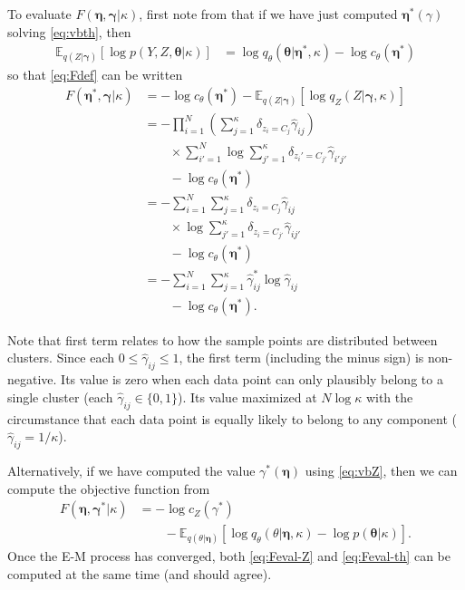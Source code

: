 \documentclass[aps,showpacs,twocolumn,prd,superscriptaddress,nofootinbib]{revtex4}
\newcommand{\nn}{\nonumber}
\newcommand{\E}[1]{{\mathbb E}_{#1}\!}
\begin{document}
To evaluate $F(\bm\eta,\bm\gamma|\kappa)$, first note from that if we have just computed $\bm\eta^*(\gamma)$ solving \eqref{eq:vbth}, then 
\begin{align}
  \E{q(Z|\bm\gamma)}\left[\log p(Y,Z,\bm\theta|\kappa)\right]&=\log q_\theta(\bm\theta|\bm\eta^*,\kappa)-\log c_\theta(\bm\eta^*)
\end{align}
so that \eqref{eq:Fdef} can be written
\begin{align}
  F(\bm\eta^*,\bm\gamma|\kappa)&=-\log c_\theta(\bm\eta^*) -\E{q(Z|\bm\gamma)}\left[\log q_Z(Z|\bm\gamma,\kappa)\right]\nn\\
  &=-\prod_{i=1}^N\left(\sum_{j=1}^\kappa\delta_{z_i{=}C_j}\hat\gamma_{ij}\right)
  \nn\\
  &\qquad\times
  \sum_{i'=1}^N\log\sum_{j'=1}^\kappa\delta_{z_i'{=}C_{j'}}\hat\gamma_{i'j'}
  \nn\\
  &\qquad-\log c_\theta(\bm\eta^*)\nn\\
  &=-\sum_{i=1}^N\sum_{j=1}^\kappa\delta_{z_i{=}C_j}\hat\gamma_{ij}
  \nn\\
  &\qquad\times
    \log\sum_{j'=1}^\kappa\delta_{z_i{=}C_{j'}}\hat\gamma_{ij'}
  \nn\\
  &\qquad-\log c_\theta(\bm\eta^*)
  \nn\\
  &=-\sum_{i=1}^N\sum_{j=1}^\kappa\hat\gamma^*_{ij}\log\hat\gamma_{ij}
  \nn\\
  &\qquad-\log c_\theta(\bm\eta^*)
  \label{eq:Feval-th}
  .
\end{align}

Note that first term relates to how the sample points are distributed between clusters.  Since each $0\leq\hat\gamma_{ij}\leq 1$, the first term (including the minus sign) is non-negative.  Its value is zero when each data point can only plausibly belong to a single cluster (each $\hat\gamma_{ij}\in\{0,1\}$).  Its value maximized at  $N\log\kappa$ with the circumstance that each data point is equally likely to belong to any component ($\hat\gamma_{ij}=1/\kappa$).

Alternatively, if we have computed the value $\gamma^*(\bm\eta)$ using \eqref{eq:vbZ}, then we can compute the objective function from
\begin{align}
  F(\bm\eta,\bm\gamma^*|\kappa)&=-\log c_Z(\gamma^*)\nn\\
  &\qquad-\E{q(\theta|\bm\eta)}\left[\log q_\theta(\theta|\bm\eta,\kappa)-\log p(\bm\theta|\kappa)\right]
  .\label{eq:Feval-Z}
\end{align}
Once the E-M process has converged, both \eqref{eq:Feval-Z} and \eqref{eq:Feval-th} can be computed at the same time (and should agree).
\end{document}
